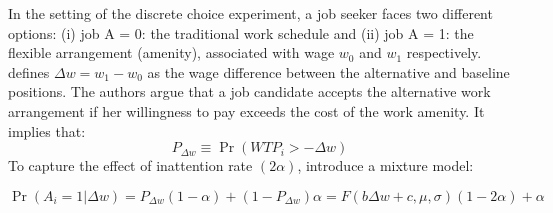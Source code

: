 \documentclass[11pt]{article}
\begin{document}
In the setting of the discrete choice experiment, a job seeker faces two different options: (i) job A = 0: the traditional work schedule and (ii) job A = 1: the flexible arrangement (amenity), associated with wage $w_0$ and $w_1$ respectively. \cite{10.1257/aer.20161500} defines $\Delta w = w_1 - w_0$ as the wage difference between the alternative and baseline positions. The authors argue that a job candidate accepts the alternative work arrangement if her willingness to pay exceeds the cost of the work amenity. It implies that:
$$
P_{\Delta w} \equiv \operatorname{Pr}\left(W T P_i>-\Delta w\right)
$$
To capture the effect of inattention rate $(2 \alpha)$, \cite{10.1257/aer.20161500} introduce a mixture model:

\begin{equation}
\operatorname{Pr}(A_i=1 | \Delta w) = P_{\Delta w}(1-\alpha)+(1-P_{\Delta w}) \alpha =F(b \Delta w+c, \mu, \sigma)(1-2 \alpha)+\alpha
\end{equation}
\end{document}
